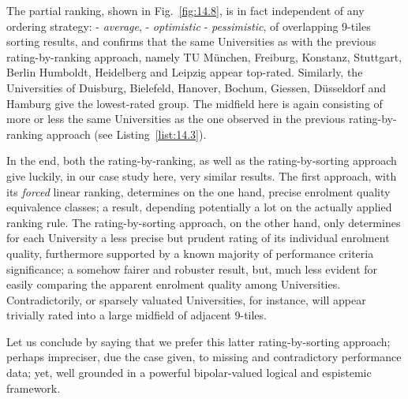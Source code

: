 The partial ranking, shown in Fig.~\vref{fig:14.8}, is in fact independent of any ordering strategy: - \emph{average}, - \emph{optimistic} - \emph{pessimistic}, of overlapping 9-tiles sorting results, and confirms that the same Universities as with the previous rating-by-ranking approach, namely TU München, Freiburg, Konstanz, Stuttgart, Berlin Humboldt, Heidelberg and Leipzig appear top-rated. Similarly, the Universities of Duisburg, Bielefeld, Hanover, Bochum, Giessen, Düsseldorf and Hamburg give the lowest-rated group. The midfield here is again consisting of more or less the same Universities as the one observed in the previous rating-by-ranking approach (see Listing~\vref{list:14.3}).

In the end, both the \Copeland rating-by-ranking, as well as the rating-by-sorting approach give luckily, in our case study here, very similar results. The first approach, with its \emph{forced} linear ranking, determines on the one hand, precise enrolment quality equivalence classes; a result, depending potentially a lot on the actually applied ranking rule. The rating-by-sorting approach, on the other hand, only determines for each University a less precise but prudent rating of its individual enrolment quality, furthermore supported by a known majority of performance criteria significance; a somehow fairer and robuster result, but, much less evident for easily comparing the apparent enrolment quality among Universities. Contradictorily, or sparsely valuated Universities, for instance, will appear trivially rated into a large midfield of adjacent 9-tiles.

Let us conclude by saying that we prefer this latter rating-by-sorting approach; perhaps impreciser, due the case given, to missing and contradictory performance data; yet, well grounded in a powerful bipolar-valued logical and espistemic framework.
 
\clearpage


%